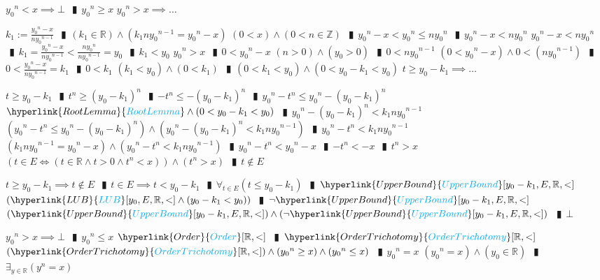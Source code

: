 \documentclass{book}
\newcommand{\rf}[1]{\hyperlink{#1}{\textcolor{cyan}{#1}}}
\newcommand{\abr}{:=}
\newcommand{\pipe}{$\phantom{(}\vrectangleblack\phantom{)}$}
\newcommand{\pr}[1]{\left(#1\right)}
\begin{document}
\begin{enumerate}
\begin{enumerate}
    \lit ${y_0}^n < x \implies \bot$ \pipe ${y_0}^n \geq x$
    \lit ${y_0}^n > x \implies \ldots$
    \begin{enumerate}
      \lit $k_1 \abr \frac{{y_0}^n - x}{n {y_0}^{n - 1}}$ \pipe $(k_1 \in \mathbb{R}) \land (k_1 n {y_0}^{n - 1} = {y_0}^n - x)$
      \lit $(0 < x) \land (0 < n \in \mathbb{Z})$ \pipe ${y_0}^n - x < {y_0}^n \leq n {y_0}^n$ \pipe ${y_0}^n - x < n {y_0}^n$
      \lit ${y_0}^n - x < n {y_0}^n$ \pipe $k_1 = \frac{{y_0}^n - x}{n {y_0}^{n - 1}} < \frac{n {y_0}^n}{n {y_0}^{n - 1}} = y_0$ \pipe $k_1 < y_0$
      \lit ${y_0}^n > x$ \pipe $0 < {y_0}^n - x$
      \lit $(n > 0) \land (y_0 > 0)$ \pipe $0 < n {y_0}^{n - 1}$
      \lit $(0 < {y_0}^n - x) \land 0 < (n {y_0}^{n - 1})$ \pipe $0 < \frac{{y_0}^n - x}{n {y_0}^{n - 1}} = k_1$ \pipe $0 < k_1$
      \lit $(k_1 < y_0) \land (0 < k_1)$ \pipe $(0 < k_1 < y_0) \land (0 < y_0 - k_1 < y_0)$
      \lit $t \geq y_0 - k_1 \implies \ldots$
      \begin{enumerate}
        \lit $t \geq y_0 - k_1$ \pipe $t^n \geq (y_0 - k_1)^n$ \pipe $-t^n \leq -(y_0 - k_1)^n$ \pipe ${y_0}^n - t^n \leq {y_0}^n - (y_0 - k_1)^n$
        \lit $\rf{RootLemma} \land (0 < y_0 - k_1 < y_0)$ \pipe ${y_0}^n - (y_0 - k_1)^n < k_1 n {y_0}^{n - 1}$
        \lit $\pr{{y_0}^n - t^n \leq {y_0}^n - (y_0 - k_1)^n} \land \pr{{y_0}^n - (y_0 - k_1)^n < k_1 n {y_0}^{n - 1}}$ \pipe ${y_0}^n - t^n < k_1 n {y_0}^{n - 1}$
        \lit $(k_1 n {y_0}^{n - 1} = {y_0}^n - x) \land ({y_0}^n - t^n < k_1 n {y_0}^{n - 1})$ \pipe ${y_0}^n - t^n < {y_0}^n - x$ \pipe $-t^n < -x$ \pipe $t^n > x$
        \lit $\pr{t \in E \iff (t \in \mathbb{R} \land t > 0 \land t^n < x)} \land (t^n > x)$ \pipe $t \notin E$
      \end{enumerate}
      \lit $t \geq y_0 - k_1 \implies t \notin E$ \pipe $t \in E \implies t < y_0 - k_1$ \pipe $\forall_{t \in E}(t \leq y_0 - k_1)$ \pipe $\rf{UpperBound}[y_0 - k_1, E, \mathbb{R}, <]$
      \lit $\pr{\rf{LUB}[y_0, E, \mathbb{R}, <] \land (y_0 - k_1 < y_0)}$ \pipe $\lnot \rf{UpperBound}[y_0 - k_1, E, \mathbb{R}, <]$
      \lit $(\rf{UpperBound}[y_0 - k_1, E, \mathbb{R}, <]) \land (\lnot \rf{UpperBound}[y_0 - k_1, E, \mathbb{R}, <])$ \pipe $\bot$
    \end{enumerate}
    \lit ${y_0}^n > x \implies \bot$ \pipe ${y_0}^n \leq x$
    \lit $\rf{Order}[\mathbb{R}, <]$ \pipe $\rf{OrderTrichotomy}[\mathbb{R}, <]$
    \lit $(\rf{OrderTrichotomy}[\mathbb{R}, <]) \land({y_0}^n \geq x) \land ({y_0}^n \leq x)$ \pipe ${y_0}^n = x$
    \lit $({y_0}^n = x) \land (y_0 \in \mathbb{R})$ \pipe $\exists_{y \in \mathbb{R}}(y^n = x)$

\end{enumerate}
\end{enumerate}
\end{document}
